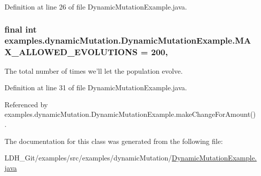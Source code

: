 Definition at line 26 of file Dynamic\-Mutation\-Example.\-java.

\hypertarget{classexamples_1_1dynamic_mutation_1_1_dynamic_mutation_example_a74bd73189529620c12a7b9c228aa04fc}{
\subsubsection[{M\-A\-X\-\_\-\-A\-L\-L\-O\-W\-E\-D\-\_\-\-E\-V\-O\-L\-U\-T\-I\-O\-N\-S}]{\setlength{\rightskip}{0pt plus 5cm}final int examples.\-dynamic\-Mutation.\-Dynamic\-Mutation\-Example.\-M\-A\-X\-\_\-\-A\-L\-L\-O\-W\-E\-D\-\_\-\-E\-V\-O\-L\-U\-T\-I\-O\-N\-S = 200\hspace{0.3cm}{\ttfamily [static]}, {\ttfamily [private]}}}\label{classexamples_1_1dynamic_mutation_1_1_dynamic_mutation_example_a74bd73189529620c12a7b9c228aa04fc}
The total number of times we'll let the population evolve. 

Definition at line 31 of file Dynamic\-Mutation\-Example.\-java.



Referenced by examples.\-dynamic\-Mutation.\-Dynamic\-Mutation\-Example.\-make\-Change\-For\-Amount().



The documentation for this class was generated from the following file\-:\begin{DoxyCompactItemize}
\item 
L\-D\-H\-\_\-\-Git/examples/src/examples/dynamic\-Mutation/\hyperlink{_dynamic_mutation_example_8java}{Dynamic\-Mutation\-Example.\-java}\end{DoxyCompactItemize}
